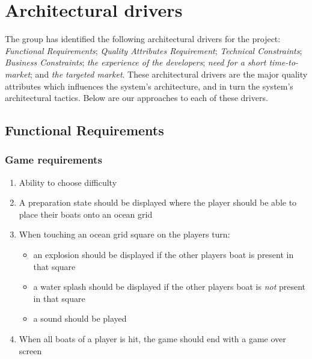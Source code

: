 \chapter{Architectural drivers}
The group has identified the following architectural drivers for the project: \emph{Functional Requirements}; \emph{Quality Attributes Requirement}; \emph{Technical Constraints}; \emph{Business Constraints}; \emph{the experience of the developers}; \emph{need for a short time-to-market}; and \emph{the targeted market}. These architectural drivers are the major quality attributes which influences the system's architecture, and in turn the system's architectural tactics\cite{pensum}. Below are our approaches to each of these drivers.



	\section{Functional Requirements}
		\subsection{Game requirements}
		\begin{enumerate}
			\item Ability to choose difficulty
			\item A preparation state should be displayed where the player should be able to place their boats onto an ocean grid
			\item When touching an ocean grid square on the players turn:
				\begin{itemize}
					\item an explosion should be displayed if the other players boat is present in that square
					\item a water splash should be displayed if the other players boat is \emph{not} present in that square
					\item a sound should be played
				\end{itemize}
			\item When all boats of a player is hit, the game should end with a game over screen
		\end{enumerate}


